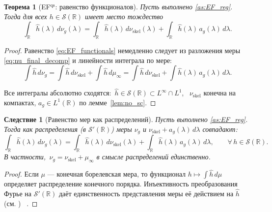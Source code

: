 \documentclass{article}
\numberwithin{equation}{section}
\theoremstyle{plain}
\newtheorem{theorem}{Теорема}
\newtheorem{corollary}{Следствие}
\theoremstyle{definition}
\theoremstyle{remark}
\def\infty{∞}\def\partial{∂}\def\sum{Σ}\def\int{∫}%
\begin{document}
\begin{theorem}[EF$^{\mathrm{qs}}$: равенство функционалов]
\label{thm:EF_functionals}
Пусть выполнено \ref{as:EF_reg}. Тогда для всех $h\in\mathcal S(\mathbb R)$ имеет место тождество
\begin{equation}
\label{eq:EF_functionals}
\int_{\mathbb R}\widehat h(\lambda)\,d\nu_g(\lambda)
=\int_{\mathbb R}\widehat h(\lambda)\,d\nu_{\mathrm{skel}}(\lambda)
+\int_{\mathbb R}\widehat h(\lambda)\,a_g(\lambda)\,d\lambda.
\end{equation}
\end{theorem}

\begin{proof}
Равенство \eqref{eq:EF_functionals} немедленно следует из разложения меры
\eqref{eq:nu_final_decomp} и линейности интеграла по мере:
\begin{equation}
\int \widehat h\,d\nu_g
=\int \widehat h\,d\nu_{\mathrm{skel}}+\int \widehat h\,d\mu_\infty
=\int \widehat h\,d\nu_{\mathrm{skel}}+\int \widehat h(\lambda)\,a_g(\lambda)\,d\lambda.
\label{eq:QSSC0031}
\end{equation}

Все интегралы абсолютно сходятся: $\,\widehat h\in\mathcal S(\mathbb R)\subset L^\infty\cap L^1$,~\cite{SteinShakarchi2003}
$\nu_{\mathrm{skel}}$ конечна на компактах, $a_g\in L^1(\mathbb R)$ по лемме~\ref{lem:no_sc}.
\end{proof}

\begin{corollary}[Равенство мер как распределений]
\label{cor:measures_as_distributions}
Пусть выполнено \ref{as:EF_reg}. Тогда как распределения (в $\mathcal S'(\mathbb R)$) меры
$\nu_g$ и $\nu_{\mathrm{skel}}+a_g(\lambda)\,d\lambda$ совпадают:
\begin{equation}
\label{eq:measures_equal}
\int_{\mathbb R}\widehat h(\lambda)\,d\nu_g(\lambda)
=\int_{\mathbb R}\widehat h(\lambda)\,d\nu_{\mathrm{skel}}(\lambda)
+\int_{\mathbb R}\widehat h(\lambda)\,a_g(\lambda)\,d\lambda,
\qquad \forall\,h\in\mathcal S(\mathbb R).
\end{equation}
В частности, $\,\nu_g=\nu_{\mathrm{skel}}+\mu_\infty$ в смысле распределений единственно.
\end{corollary}

\begin{proof}
Если $\mu$ — конечная борелевская мера, то функционал $h\mapsto\int\widehat h\,d\mu$ определяет
распределение конечного порядка. Инъективность преобразования Фурье на $\mathcal S'(\mathbb R)$
даёт единственность представления меры её действием на $\widehat h$ (см. \cite[§7.1]{Hormander1990}) ~\cite{Schwartz1966}.
\end{proof}
\end{document}
